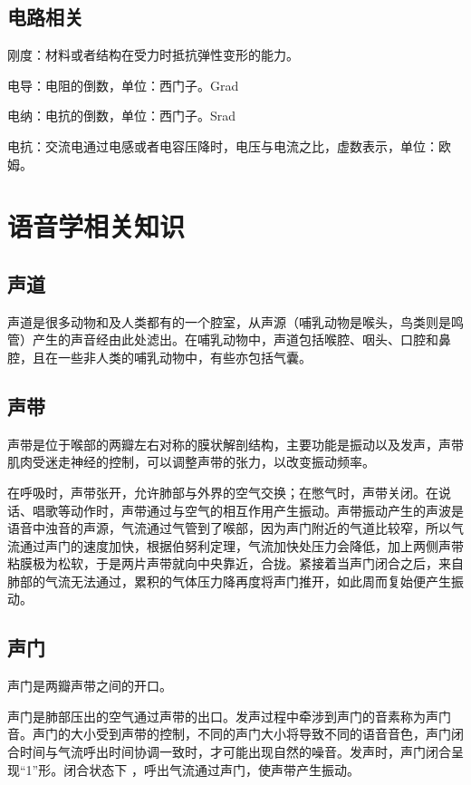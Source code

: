 \subsection{电路相关}
刚度：材料或者结构在受力时抵抗弹性变形的能力。


电导：电阻的倒数，单位：西门子。Grad  


电纳：电抗的倒数，单位：西门子。Srad 


电抗：交流电通过电感或者电容压降时，电压与电流之比，虚数表示，单位：欧姆。

\section{语音学相关知识}
\subsection{声道}

声道是很多动物和及人类都有的一个腔室，从声源（哺乳动物是喉头，鸟类则是鸣管）产生的声音经由此处滤出。在哺乳动物中，声道包括喉腔、咽头、口腔和鼻腔，且在一些非人类的哺乳动物中，有些亦包括气囊。

\subsection{声带}

声带是位于喉部的两瓣左右对称的膜状解剖结构，主要功能是振动以及发声，声带肌肉受迷走神经的控制，可以调整声带的张力，以改变振动频率。


在呼吸时，声带张开，允许肺部与外界的空气交换；在憋气时，声带关闭。在说话、唱歌等动作时，声带通过与空气的相互作用产生振动。声带振动产生的声波是语音中浊音的声源，气流通过气管到了喉部，因为声门附近的气道比较窄，所以气流通过声门的速度加快，根据伯努利定理，气流加快处压力会降低，加上两侧声带粘膜极为松软，于是两片声带就向中央靠近，合拢。紧接着当声门闭合之后，来自肺部的气流无法通过，累积的气体压力降再度将声门推开，如此周而复始便产生振动。

\subsection{声门}

声门是两瓣声带之间的开口。


声门是肺部压出的空气通过声带的出口。发声过程中牵涉到声门的音素称为声门音。声门的大小受到声带的控制，不同的声门大小将导致不同的语音音色，声门闭合时间与气流呼出时间协调一致时，才可能出现自然的噪音。发声时，声门闭合呈现“1”形。闭合状态下 ，呼出气流通过声门，使声带产生振动。


